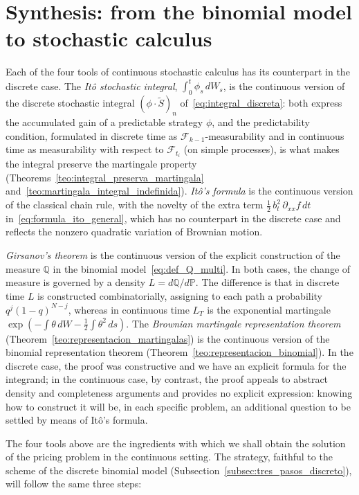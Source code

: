 \documentclass[11pt,a4paper,oneside]{report}
\theoremstyle{plain}
\theoremstyle{definition}
\theoremstyle{remark}
\newcommand{\PP}{\mathbb{P}}
\newcommand{\Q}{\mathbb{Q}}
\newcommand{\F}{\mathcal{F}}
\newcommand{\1}{\mathbf{1}}
\begin{document}
\section{Synthesis: from the binomial model to stochastic calculus}
\label{sec:sintesis_cap4}

Each
of the four tools of continuous stochastic calculus has its
counterpart in the discrete case. The \emph{Itô stochastic
integral}, $\int_0^t \phi_s\, dW_s$, is the continuous version of the
discrete stochastic integral $(\phi \cdot \widetilde S)_n$
of~\eqref{eq:integral_discreta}: both express the accumulated gain of
a predictable strategy $\phi$, and the predictability condition,
formulated in discrete time as $\F_{k-1}$-measurability and in
continuous time as measurability with respect to $\F_{t_i}$ (on
simple processes), is what makes the integral preserve the martingale
property (Theorems~\ref{teo:integral_preserva_martingala}
and~\ref{teo:martingala_integral_indefinida}). \emph{Itô's formula}
is the continuous version of the classical chain rule, with the
novelty of the extra term $\tfrac{1}{2}\, b_t^2\, \partial_{xx} f\, dt$
in~\eqref{eq:formula_ito_general}, which has no counterpart in the
discrete case and reflects the nonzero quadratic variation of
Brownian motion.

\emph{Girsanov's theorem} is the continuous version of the explicit
construction of the measure $\Q$ in the binomial
model~\eqref{eq:def_Q_multi}. In both cases, the change of measure is
governed by a density $L = d\Q/d\PP$. The difference is that in
discrete time $L$ is constructed combinatorially, assigning to each
path a probability $q^j(1-q)^{N-j}$, whereas in continuous time $L_T$
is the exponential martingale
$\exp(-\int \theta\, dW - \tfrac{1}{2}\int \theta^2\, ds)$. The
\emph{Brownian martingale representation theorem}
(Theorem~\ref{teo:representacion_martingalas}) is the continuous
version of the binomial representation theorem
(Theorem~\ref{teo:representacion_binomial}). In the discrete case,
the proof was constructive and we have an explicit formula for the
integrand; in the continuous case, by contrast, the proof appeals to
abstract density and completeness arguments and provides no explicit
expression: knowing how to construct it will be, in each specific
problem, an additional question to be settled by means of Itô's
formula.

The four
tools above are the ingredients with which we shall obtain the
solution of the pricing problem in the continuous setting. The
strategy, faithful to the scheme of the discrete binomial model
(Subsection~\ref{subsec:tres_pasos_discreto}), will follow the same
three steps:
\end{document}
